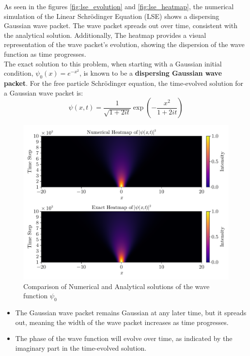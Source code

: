 \documentclass[8pt, a4paper, twocolumn]{article}
\begin{document}
As seen in the figures \ref{fig:lse_evolution} and \ref{fig:lse_heatmap}, the numerical simulation of the Linear Schrödinger Equation (LSE) shows
a dispersing Gaussian wave packet. The wave packet spreads out over time, consistent with the 
analytical solution. Additionally, The heatmap provides a visual representation of the wave packet's evolution,
showing the dispersion of the wave function as time progresses.\\

The exact solution to this problem, when starting with a Gaussian initial condition, $\psi_0(x) = e^{-x^2}$, 
is known to be a \textbf{dispersing Gaussian wave packet}. For the free particle Schrödinger equation, the 
time-evolved solution \cite{shankar2012principles} for a Gaussian wave packet is:
\begin{equation}
    \psi(x,t) = \frac{1}{\sqrt{1 + 2it}} \exp\left(- \frac{x^2}{1 + 2it}\right)
\end{equation}
\begin{figure}[h!]
	\centering
	\includegraphics[width=\linewidth]{../figs/lse_comparison_heatmap.pdf}
	\caption{Comparison of Numerical and Analytical solutions of the wave function $\psi_0$}
	\label{fig:lse_comparison_heatmap}
\end{figure}
\begin{itemize}
	\item The Gaussian wave packet remains Gaussian at any later time, but it spreads 
	out, meaning the width of the wave packet increases as time progresses.
	\item The phase of the wave function will evolve over time, as indicated by 
	the imaginary part in the time-evolved solution.
\end{itemize}
\end{document}
